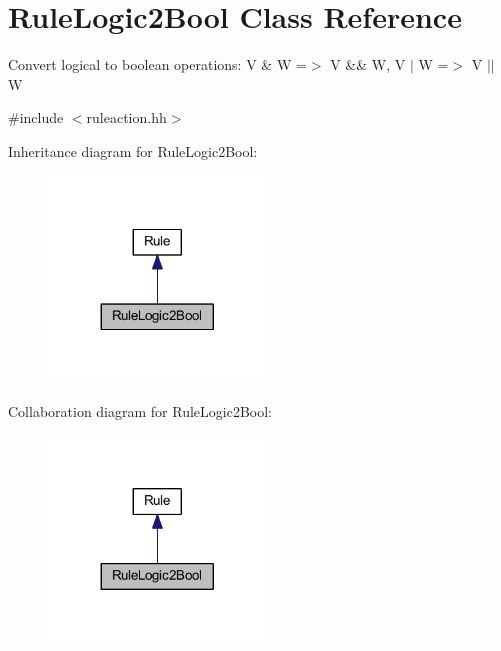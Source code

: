 \hypertarget{class_rule_logic2_bool}{}\section{Rule\+Logic2\+Bool Class Reference}
\label{class_rule_logic2_bool}


Convert logical to boolean operations\+: {\ttfamily V \& W =$>$ V \&\& W, V $\vert$ W =$>$ V $\vert$$\vert$ W}  




{\ttfamily \#include $<$ruleaction.\+hh$>$}



Inheritance diagram for Rule\+Logic2\+Bool\+:
\nopagebreak
\begin{figure}[H]
\begin{center}
\leavevmode
\includegraphics[width=164pt]{class_rule_logic2_bool__inherit__graph}
\end{center}
\end{figure}


Collaboration diagram for Rule\+Logic2\+Bool\+:
\nopagebreak
\begin{figure}[H]
\begin{center}
\leavevmode
\includegraphics[width=164pt]{class_rule_logic2_bool__coll__graph}
\end{center}
\end{figure}
